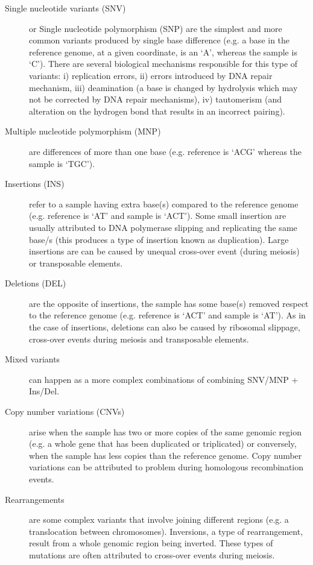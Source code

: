 \begin{description}

\item[Single nucleotide variants (SNV)] or Single nucleotide polymorphism (SNP) are the simplest and more common variants produced by single base difference (e.g. a base in the reference genome, at a given coordinate,  is an ‘A’, whereas the sample is ‘C’). There are several biological mechanisms responsible for this type of variants: i) replication errors, ii) errors introduced by DNA repair mechanism, iii) deamination (a base is changed by hydrolysis which may not be corrected by DNA repair mechanisms), iv) tautomerism (and alteration on the hydrogen bond that results in an incorrect pairing).

\item[Multiple nucleotide polymorphism (MNP)] are differences of more than one base (e.g. reference is ‘ACG’ whereas the sample is ‘TGC’).

\item[Insertions (INS)] refer to a sample having extra base(s) compared to the reference genome (e.g. reference is ‘AT’ and sample is ‘ACT’). Some small insertion are usually attributed to DNA polymerase slipping and replicating the same base/s (this produces a type of insertion known as duplication). Large insertions are can be caused by unequal cross-over event (during meiosis) or transposable elements.

\item[Deletions (DEL)] are the opposite of insertions, the sample has some base(s) removed respect to the reference genome (e.g. reference is ‘ACT’ and sample is ‘AT’). As in the case of insertions, deletions can also be caused by ribosomal slippage, cross-over events during meiosis and transposable elements. 

\item[Mixed variants] can happen as a more complex combinations of combining SNV/MNP + Ins/Del.

\item[Copy number variations (CNVs)] arise when the sample has two or more copies of the same genomic region (e.g. a whole gene that has been duplicated or triplicated) or conversely, when the sample has less copies than the reference genome. Copy number variations can be attributed to problem during homologous recombination events.

\item[Rearrangements] are some complex variants that involve joining different regions (e.g. a translocation between chromosomes). Inversions, a type of rearrangement, result from a whole genomic region being inverted. These types of mutations are often attributed to cross-over events during meiosis.

\end{description}

